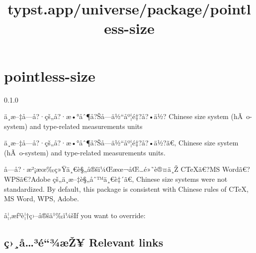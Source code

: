 \title{typst.app/universe/package/pointless-size}

\label{banner}
\section{pointless-size}\label{pointless-size}

{ 0.1.0 }

ä¸­æ--‡å­---å?·çš„å?·æ•°åˆ¶å?Šå­---ä½``åº¦é‡?å?•ä½? Chinese size system
(hÃ~o-system) and type-related measurements units

\label{readme}
ä¸­æ--‡å­---å?·çš„å?·æ•°åˆ¶å?Šå­---ä½``åº¦é‡?å?•ä½?ã€‚ Chinese size system
(hÃ~o-system) and type-related measurements units.

\begin{Shaded}
\begin{Highlighting}[]


\end{Highlighting}
\end{Shaded}

å­---å?·æ²¡æœ‰ç»Ÿä¸€è§„å®šï¼Œæœ¬åŒ\ldots é»˜è®¤ä¸Ž CTeXã€?MS
Wordã€?WPSã€?Adobe çš„ä¸­æ--‡è§„åˆ™ä¸€è‡´ã€‚ Chinese size systems were
not standardized. By default, this package is consistent with Chinese
rules of CTeX, MS Word, WPS, Adobe.

å¦‚æƒ³è¦†ç›--å®šä¹‰ï¼šIf you want to override:

\begin{Shaded}
\begin{Highlighting}[]


\end{Highlighting}
\end{Shaded}

\subsection{ç›¸å\ldots³é``¾æŽ¥ Relevant
links}\label{uxe7uxe5uxb3uxe9uxbeuxe6ux17e-relevant-links}

